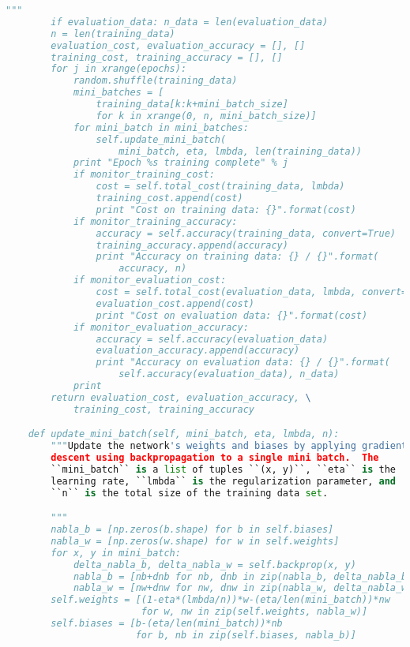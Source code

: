 \begin{lstlisting}[language=Python]
        """
        if evaluation_data: n_data = len(evaluation_data)
        n = len(training_data)
        evaluation_cost, evaluation_accuracy = [], []
        training_cost, training_accuracy = [], []
        for j in xrange(epochs):
            random.shuffle(training_data)
            mini_batches = [
                training_data[k:k+mini_batch_size]
                for k in xrange(0, n, mini_batch_size)]
            for mini_batch in mini_batches:
                self.update_mini_batch(
                    mini_batch, eta, lmbda, len(training_data))
            print "Epoch %s training complete" % j
            if monitor_training_cost:
                cost = self.total_cost(training_data, lmbda)
                training_cost.append(cost)
                print "Cost on training data: {}".format(cost)
            if monitor_training_accuracy:
                accuracy = self.accuracy(training_data, convert=True)
                training_accuracy.append(accuracy)
                print "Accuracy on training data: {} / {}".format(
                    accuracy, n)
            if monitor_evaluation_cost:
                cost = self.total_cost(evaluation_data, lmbda, convert=True)
                evaluation_cost.append(cost)
                print "Cost on evaluation data: {}".format(cost)
            if monitor_evaluation_accuracy:
                accuracy = self.accuracy(evaluation_data)
                evaluation_accuracy.append(accuracy)
                print "Accuracy on evaluation data: {} / {}".format(
                    self.accuracy(evaluation_data), n_data)
            print
        return evaluation_cost, evaluation_accuracy, \
            training_cost, training_accuracy

    def update_mini_batch(self, mini_batch, eta, lmbda, n):
        """Update the network's weights and biases by applying gradient
        descent using backpropagation to a single mini batch.  The
        ``mini_batch`` is a list of tuples ``(x, y)``, ``eta`` is the
        learning rate, ``lmbda`` is the regularization parameter, and
        ``n`` is the total size of the training data set.

        """
        nabla_b = [np.zeros(b.shape) for b in self.biases]
        nabla_w = [np.zeros(w.shape) for w in self.weights]
        for x, y in mini_batch:
            delta_nabla_b, delta_nabla_w = self.backprop(x, y)
            nabla_b = [nb+dnb for nb, dnb in zip(nabla_b, delta_nabla_b)]
            nabla_w = [nw+dnw for nw, dnw in zip(nabla_w, delta_nabla_w)]
        self.weights = [(1-eta*(lmbda/n))*w-(eta/len(mini_batch))*nw
                        for w, nw in zip(self.weights, nabla_w)]
        self.biases = [b-(eta/len(mini_batch))*nb
                       for b, nb in zip(self.biases, nabla_b)]


\end{lstlisting}
